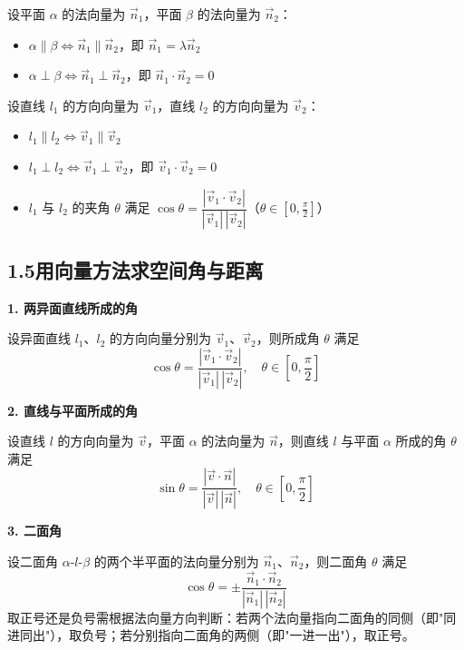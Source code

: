 \documentclass[12pt, a4paper]{ctexart}
\begin{document}
\begin{knowledgebox}[用向量判定面面关系]
设平面 $\alpha$ 的法向量为 $\vec{n}_1$，平面 $\beta$ 的法向量为 $\vec{n}_2$：

\begin{itemize}[nosep]
  \item $\alpha\parallel\beta\iff\vec{n}_1\parallel\vec{n}_2$，即 $\vec{n}_1=\lambda\vec{n}_2$
  \item $\alpha\perp\beta\iff\vec{n}_1\perp\vec{n}_2$，即 $\vec{n}_1\cdot\vec{n}_2=0$
\end{itemize}
\end{knowledgebox}

\begin{knowledgebox}[用向量判定线线关系]
设直线 $l_1$ 的方向向量为 $\vec{v}_1$，直线 $l_2$ 的方向向量为 $\vec{v}_2$：

\begin{itemize}[nosep]
  \item $l_1\parallel l_2\iff\vec{v}_1\parallel\vec{v}_2$
  \item $l_1\perp l_2\iff\vec{v}_1\perp\vec{v}_2$，即 $\vec{v}_1\cdot\vec{v}_2=0$
  \item $l_1$ 与 $l_2$ 的夹角 $\theta$ 满足 $\cos\theta=\dfrac{|\vec{v}_1\cdot\vec{v}_2|}{|\vec{v}_1|\,|\vec{v}_2|}$（$\theta\in[0,\tfrac{\pi}{2}]$）
\end{itemize}
\end{knowledgebox}

\subsection*{1.5\quad 用向量方法求空间角与距离}

\begin{knowledgebox}[空间角的向量求法]

\textbf{1. 两异面直线所成的角}

设异面直线 $l_1$、$l_2$ 的方向向量分别为 $\vec{v}_1$、$\vec{v}_2$，则所成角 $\theta$ 满足
\[
\cos\theta=\frac{|\vec{v}_1\cdot\vec{v}_2|}{|\vec{v}_1|\,|\vec{v}_2|},\quad\theta\in\left[0,\frac{\pi}{2}\right]
\]

\textbf{2. 直线与平面所成的角}

设直线 $l$ 的方向向量为 $\vec{v}$，平面 $\alpha$ 的法向量为 $\vec{n}$，则直线 $l$ 与平面 $\alpha$ 所成的角 $\theta$ 满足
\[
\sin\theta=\frac{|\vec{v}\cdot\vec{n}|}{|\vec{v}|\,|\vec{n}|},\quad\theta\in\left[0,\frac{\pi}{2}\right]
\]

\textbf{3. 二面角}

设二面角 $\alpha$-$l$-$\beta$ 的两个半平面的法向量分别为 $\vec{n}_1$、$\vec{n}_2$，则二面角 $\theta$ 满足
\[
\cos\theta=\pm\frac{\vec{n}_1\cdot\vec{n}_2}{|\vec{n}_1|\,|\vec{n}_2|}
\]
取正号还是负号需根据法向量方向判断：若两个法向量指向二面角的同侧（即"同进同出"），取负号；若分别指向二面角的两侧（即"一进一出"），取正号。
\end{knowledgebox}
\end{document}
